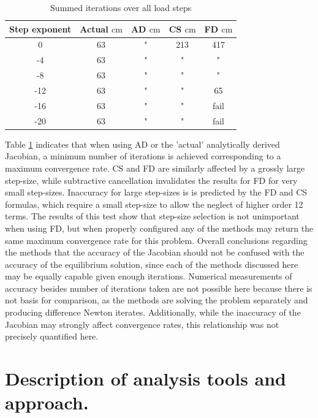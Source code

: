 \documentclass[preprint,12pt]{elsarticle}
\begin{document}
\begin{table}[!ht]    
  \centering
        \caption{Summed iterations over all load steps} \label{tab:ConvergenceStudy}   
        \begin{tabular}{c c c c c}
         \toprule
         Step exponent & Actual $\si{\centi\meter}$ & AD $\si{\centi\meter}$ & CS $\si{\centi\meter}$ & FD $\si{\centi\meter}$\\ 
        \midrule
        0 & 63 & " & 213 & 417\\
        -4 & 63 & " & " & "\\
        -8 & 63& " & " & "\\
        -12 &63& " & " &  65\\
        -16 &63& " & " & fail\\
        -20 &63& " & " & fail\\
        \bottomrule
    \end{tabular}
\end{table}

Table \ref{tab:ConvergenceStudy} indicates that when using AD or the 'actual'
analytically derived Jacobian, a minimum number of iterations is achieved
corresponding to a maximum convergence rate. CS and FD are similarly affected
by a grossly large step-size, while subtractive cancellation invalidates the
results for FD for very small step-sizes. Inaccuracy for large step-sizes is is
predicted by the FD and CS formulas, which require a small
step-size to allow the neglect of higher order 12 terms. The results of this
test show that step-size selection is not unimportant when using FD, but when
properly configured any of the methods may return the same maximum convergence
rate for this problem.  Overall conclusions regarding the methods that the accuracy of the
Jacobian should not be confused with the accuracy of the equilibrium
solution, since each of the methods discussed here may be equally capable given
enough iterations. Numerical measurements of accuracy besides number of iterations taken
are not possible here because there is not basis for comparison, as the methods are solving
the problem separately and producing difference Newton iterates. Additionally, while the inaccuracy of the Jacobian may
strongly affect convergence rates, this relationship was not precisely quantified here.


\section{Description of analysis tools and approach.} 
%
\end{document}
